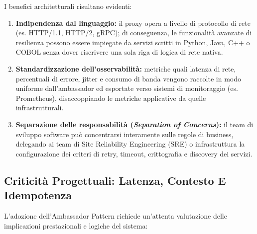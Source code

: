\documentclass[11pt, a4paper]{article}
\begin{document}
I benefici architetturali risultano evidenti:
\begin{enumerate}[noitemsep]
    \item \textbf{Indipendenza dal linguaggio:} il proxy opera a livello di protocollo di rete (es. HTTP/1.1, HTTP/2, gRPC); di conseguenza, le funzionalità avanzate di resilienza possono essere impiegate da servizi scritti in Python, Java, C++ o COBOL senza dover riscrivere una sola riga di logica di rete nativa.
    \item \textbf{Standardizzazione dell'osservabilità:} metriche quali latenza di rete, percentuali di errore, jitter e consumo di banda vengono raccolte in modo uniforme dall'ambassador ed esportate verso sistemi di monitoraggio (es. Prometheus), disaccoppiando le metriche applicative da quelle infrastrutturali.
    \item \textbf{Separazione delle responsabilità (\emph{Separation of Concerns}):} il team di sviluppo software può concentrarsi interamente sulle regole di business, delegando ai team di Site Reliability Engineering (SRE) o infrastruttura la configurazione dei criteri di retry, timeout, crittografia e discovery dei servizi.
\end{enumerate}

\subsection{Criticità Progettuali: Latenza, Contesto E Idempotenza}

L'adozione dell'Ambassador Pattern richiede un'attenta valutazione delle implicazioni prestazionali e logiche del sistema:
\end{document}
